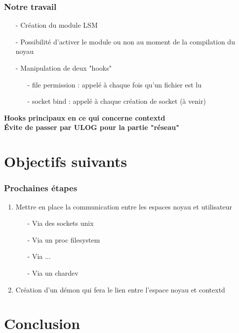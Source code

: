 \documentclass{beamer}
\begin{document}
\begin{frame}
\frametitle{Notre travail}
\begin{itemize}
	\item[-] Création du module LSM \\
	\item[-] Possibilité d'activer le module ou non au moment de la compilation du noyau \\
	\item[-] Manipulation de deux "hooks" \\
	\begin{itemize}
		\item[-] file permission : appelé à chaque fois qu'un fichier est lu
		\item[-] socket bind : appelé à chaque création de socket (à venir)
	\end{itemize}
\end{itemize}
\textbf{Hooks principaux en ce qui concerne contextd} \\
\textbf{Évite de passer par ULOG pour la partie "réseau"} \\
\end{frame}


\section{Objectifs suivants}
\begin{frame}
\frametitle{Prochaines étapes}
\begin{enumerate}
	\item Mettre en place la communication entre les espaces noyau et utilisateur
	\begin{itemize}
		\item[-] Via des sockets unix
		\item[-] Via un proc filesystem
		\item[-] Via ...
		\item[-] Via un chardev
	\end{itemize}
	\item Création d'un démon qui fera le lien entre l'espace noyau et contextd
\end{enumerate}
\end{frame}

\section{Conclusion}
\begin{frame}
\frametitle{}

\end{frame}
\end{document}
